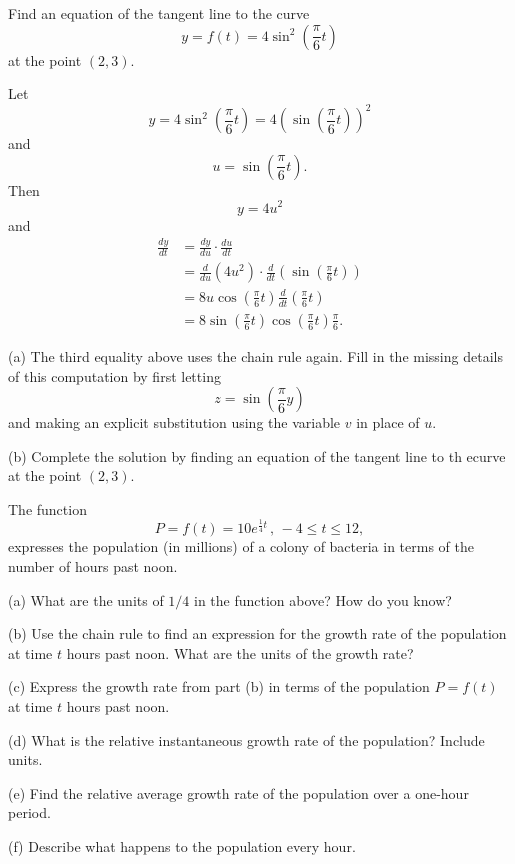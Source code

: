 \documentclass{ximera}
\begin{document}
\begin{example}  \label{Ex:df4thghg}
Find an equation of the tangent line to the curve
\[
  y = f(t) = 4 \sin^2 \left( \frac{\pi}{6}t \right)
\]
at the point $(2,3)$.

\begin{explanation}
Let 
\[
       y = 4 \sin^2 \left( \frac{\pi}{6}t \right) =  4 \left( \sin \left( \frac{\pi}{6}t \right)\right)^2
\]
and 
\[
      u = \sin\left( \frac{\pi}{6}t \right) .
\]
Then
\[
     y =4 u^2
\]
and
\begin{align*}
\frac{dy}{dt} &= \frac{dy}{du} \cdot \frac{du}{dt}  \\
                     &= \frac{d}{du} \left( 4u^2 \right)  \cdot \frac{d}{dt}\left(  \sin\left( \frac{\pi}{6}t \right)  \right)  \\
                     &= 8u   \cos \left(   \frac{\pi}{6}t  \right) \frac{d}{dt} \left( \frac{\pi}{6}t  \right)     \\
                     &= 8\sin\left( \frac{\pi}{6}t \right)  \cos \left(   \frac{\pi}{6}t  \right) \frac{\pi}{6} .
\end{align*}

\begin{question}  \label{Q:dsf4tt}
(a) The third equality above uses the chain rule again. Fill in the missing details of this computation by first letting
\[
    z = \sin \left(  \frac{\pi}{6}y \right)
\]
and making an explicit substitution using the variable $v$ in place of $u$.

(b) Complete the solution by finding an equation of the tangent line to th ecurve at the point $(2,3)$. 
\end{question}


\end{explanation}

\end{example}


\begin{example}  \label{Ex:Chdfr5llk}
The function 
\[
       P = f(t) = 10 e^{\frac{1}{4}t} \, , \, -4\leq t \leq 12 ,
\] 
expresses the population (in millions) of a colony of bacteria in terms of the number of hours past noon.

(a) What are the units of $1/4$ in the function above? How do you know?

(b)  Use the chain rule to find an expression for the growth rate of the population at time $t$ hours past noon. What are the units of the growth rate?

(c) Express the growth rate from part (b) in terms of the population $P=f(t)$ at time $t$ hours past noon.

(d) What is the relative instantaneous growth rate of the population? Include units.

(e) Find the relative average growth rate of the population over a one-hour period. 

(f) Describe what happens to the population every hour.

\end{example}
\end{document}

